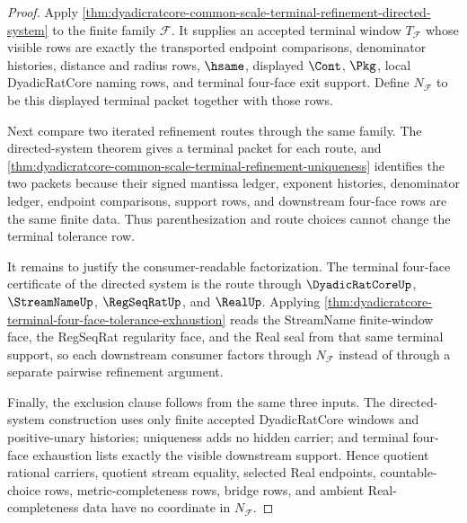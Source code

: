 \begin{proof}
Apply \autoref{thm:dyadicratcore-common-scale-terminal-refinement-directed-system} to the finite family $\mathcal{F}$. It supplies an accepted terminal window $T_{\mathcal{F}}$ whose visible rows are exactly the transported endpoint comparisons, denominator histories, distance and radius rows, $\hsame$, displayed $\Cont$, $\Pkg$, local DyadicRatCore naming rows, and terminal four-face exit support. Define $N_{\mathcal{F}}$ to be this displayed terminal packet together with those rows.

Next compare two iterated refinement routes through the same family. The directed-system theorem gives a terminal packet for each route, and \autoref{thm:dyadicratcore-common-scale-terminal-refinement-uniqueness} identifies the two packets because their signed mantissa ledger, exponent histories, denominator ledger, endpoint comparisons, support rows, and downstream four-face rows are the same finite data. Thus parenthesization and route choices cannot change the terminal tolerance row.

It remains to justify the consumer-readable factorization. The terminal four-face certificate of the directed system is the route through $\DyadicRatCoreUp$, $\StreamNameUp$, $\RegSeqRatUp$, and $\RealUp$. Applying \autoref{thm:dyadicratcore-terminal-four-face-tolerance-exhaustion} reads the StreamName finite-window face, the RegSeqRat regularity face, and the Real seal from that same terminal support, so each downstream consumer factors through $N_{\mathcal{F}}$ instead of through a separate pairwise refinement argument.

Finally, the exclusion clause follows from the same three inputs. The directed-system construction uses only finite accepted DyadicRatCore windows and positive-unary histories; uniqueness adds no hidden carrier; and terminal four-face exhaustion lists exactly the visible downstream support. Hence quotient rational carriers, quotient stream equality, selected Real endpoints, countable-choice rows, metric-completeness rows, bridge rows, and ambient Real-completeness data have no coordinate in $N_{\mathcal{F}}$.
\end{proof}

